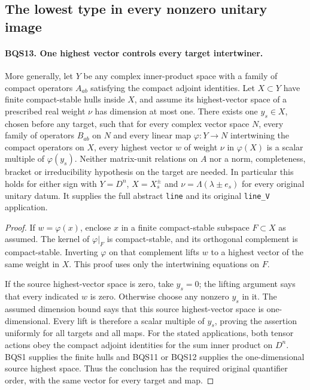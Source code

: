 \documentclass[11pt,a4paper]{article}
\numberwithin{equation}{section}
\theoremstyle{remark}\newtheorem{remark}[theorem]{Remark}
\begin{document}
\subsection{The lowest type in every nonzero unitary image}

\paragraph{BQS13. One highest vector controls every target intertwiner.}
\label{claim:BQS13}
More generally, let $Y$ be any complex inner-product space with a
family of compact operators $A_{ab}$ satisfying the compact adjoint
identities.  Let $X\subset Y$ have finite compact-stable hulls inside
$X$, and assume its highest-vector space of a prescribed real weight
$\nu$ has dimension at most one.
There exists one $y_s\in X$, chosen before any target, such that for
every complex vector space $N$, every family of operators $B_{ab}$
on $N$ and every linear map $\varphi:Y\to N$ intertwining the compact
operators on $X$, every highest vector $w$ of weight $\nu$ in
$\varphi(X)$ is a scalar multiple of $\varphi(y_s)$.
Neither matrix-unit relations on $A$ nor a norm, completeness,
bracket or irreducibility hypothesis on the target are needed.
In particular this holds for either sign with $Y=D^n$,
$X=X_s^\pm$ and $\nu=\Lambda(\lambda\pm e_s)$ for every original
unitary datum.  It supplies the full abstract \texttt{line} and
its original \texttt{line\_\allowbreak V} application.

\begin{proof}
If $w=\varphi(x)$, enclose $x$ in a finite compact-stable
subspace $F\subset X$ as assumed.
The kernel of $\varphi|_F$ is compact-stable, and its orthogonal
complement is compact-stable.  Inverting $\varphi$ on that complement
lifts $w$ to a highest vector of the same weight in $X$.
This proof uses only the intertwining equations on $F$.

If the source highest-vector space is zero, take $y_s=0$; the lifting
argument says that every indicated $w$ is zero.
Otherwise choose any nonzero $y_s$ in it.  The assumed dimension
bound says that this source highest-vector space is one-dimensional.  Every lift is
therefore a scalar multiple of $y_s$, proving the assertion uniformly
for all targets and all maps.
For the stated applications, both tensor actions obey the compact
adjoint identities for the sum inner product on $D^n$.
BQS1 supplies the finite hulls and BQS11 or BQS12 supplies the
one-dimensional source highest space.  Thus the conclusion has
the required original quantifier order, with the same vector for
every target and map.
\end{proof}
\end{document}
